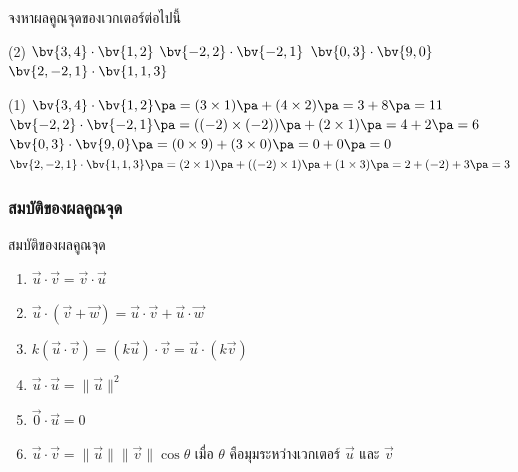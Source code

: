 \begin{frame}[t]
\begin{ex}{}
จงหาผลคูณจุดของเวกเตอร์ต่อไปนี้
\begin{tasks}(2)
\task $\bv{3,4} \cdot \bv{1,2}$
\task $\bv{-2,2} \cdot \bv{-2,1}$
\task $\bv{0,3} \cdot \bv{9,0}$
\task $\bv{2,-2,1} \cdot \bv{1,1,3}$
\end{tasks}
\end{ex}
\begin{sol}
\begin{tasks}(1)
\task $\bv{3,4} \cdot \bv{1,2} \pa = (3 \times 1) \pa + (4 \times 2) \pa = 3 + 8 \pa = 11$ \pa
\task $\bv{-2,2} \cdot \bv{-2,1} \pa = ((-2) \times (-2)) \pa + (2 \times 1) \pa = 4 + 2 \pa = 6$ \pa
\task  $\bv{0,3} \cdot \bv{9,0} \pa = (0 \times 9) + (3 \times 0) \pa = 0 + 0 \pa = 0$ \pa
\task $\bv{2,-2,1} \cdot \bv{1,1,3} \pa = (2 \times 1) \pa + ((-2) \times 1) \pa + (1 \times 3) \pa = 2 + (-2) + 3 \pa = 3$
\end{tasks}
\end{sol}
\end{frame}

\begin{frame}
\frametitle{สมบัติของผลคูณจุด}
\begin{prop}{สมบัติของผลคูณจุด}{}
\begin{enumerate}
\item $\vec{u} \cdot \vec{v} = \vec{v} \cdot \vec{u}$ \pa
\item $\vec{u} \cdot (\vec{v} + \vec{w}) =  \vec{u} \cdot \vec{v}  + \vec{u} \cdot \vec{w}$ \pa
\item $k(\vec{u} \cdot \vec{v} ) = (k\vec{u}) \cdot \vec{v} = \vec{u} \cdot (k \vec{v})$ \pa
\item $\vec{u} \cdot \vec{u} = \| \vec{u} \|^2$ \pa
\item $\vec{0} \cdot \vec{u} = 0$ \pa
\item $\vec{u} \cdot \vec{v} = \| \vec{u} \| \|\vec{v} \| \cos \theta$ เมื่อ $\theta$ คือมุมระหว่างเวกเตอร์ $\vec{u}$ และ $\vec{v}$
\end{enumerate}
\end{prop}
\end{frame}
